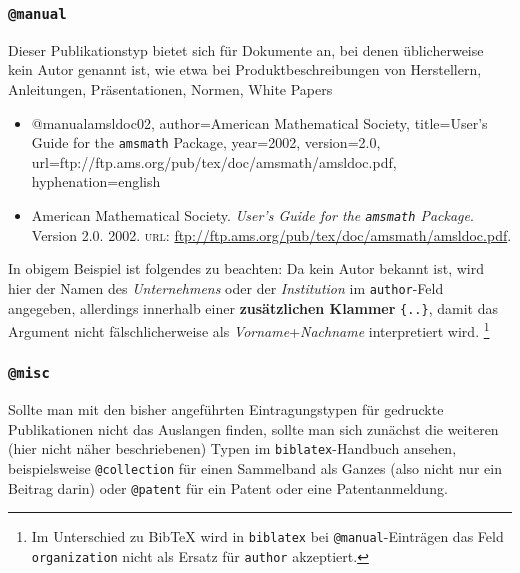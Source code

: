 \subsubsection{\texttt{@manual}}
\label{sec:@manual}
Dieser Publikationstyp bietet sich für Dokumente an, bei denen üblicherweise kein Autor genannt ist, wie etwa bei Produktbeschreibungen von Herstellern, Anleitungen, Präsentationen, Normen, White Papers \usw
%
\begin{itemize}
\item[]
\begin{GenericCode}[numbers=none]
@manual{amsldoc02,
	author={{American Mathematical Society}},
	title={User's Guide for the {\tt amsmath} Package},
	year={2002},
	version={2.0},
	url={ftp://ftp.ams.org/pub/tex/doc/amsmath/amsldoc.pdf},
	hyphenation={english}
}
\end{GenericCode}
\item[\cite{amsldoc02}]
American Mathematical Society. 
\textit{User's Guide for the {\tt amsmath} Package}. 
Version 2.0. 2002. \textsc{url}: \url{ftp://ftp.ams.org/pub/tex/doc/amsmath/amsldoc.pdf}.
\end{itemize}
%
In obigem Beispiel ist folgendes zu beachten: 
Da kein Autor bekannt ist, wird hier der Namen des \emph{Unternehmens} oder der \emph{Institution} im \texttt{author}-Feld angegeben, allerdings innerhalb einer \textbf{zusätzlichen Klammer} \texttt{\{..\}}, damit das Argument nicht fälschlicherweise als \emph{Vorname}+\emph{Nachname} interpretiert wird.%
\footnote{Im Unterschied zu BibTeX wird in \texttt{biblatex} bei \texttt{@manual}-Einträgen das Feld \texttt{organization} nicht als Ersatz für \texttt{author} akzeptiert.}


\subsubsection{\texttt{@misc}}
\label{sec:@misc}
Sollte man mit den bisher angeführten Eintragungstypen für gedruckte Publikationen
nicht das Auslangen finden, sollte man sich zunächst die weiteren (hier nicht näher beschriebenen) 
Typen im \texttt{biblatex}-Handbuch \cite{Lehman2011} ansehen, beispielsweise
\texttt{@collection} für einen Sammelband als Ganzes (also nicht nur ein Beitrag darin)
oder \texttt{@patent} für ein Patent oder eine Patentanmeldung.

